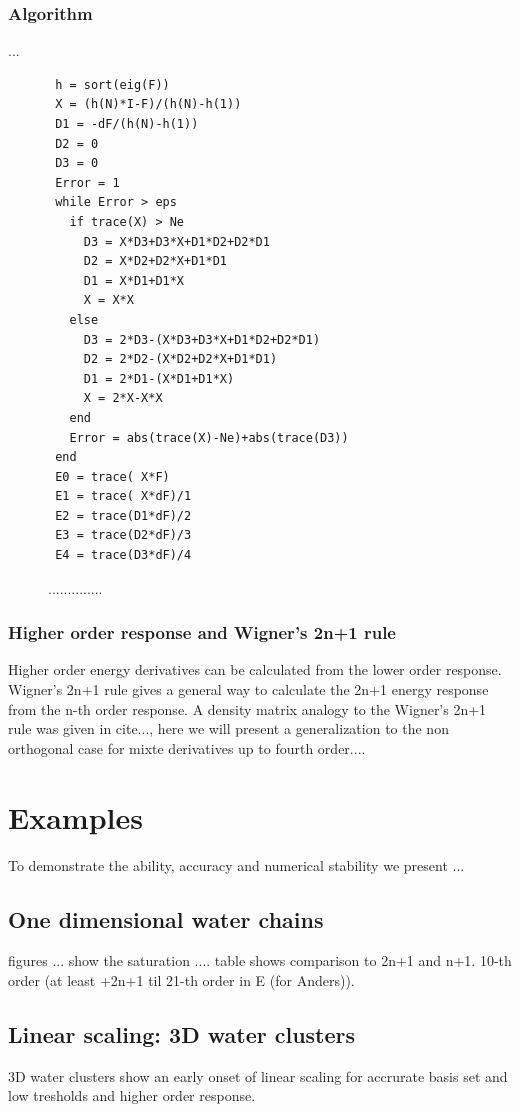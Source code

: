 \documentclass[twocolumn,showpacs,preprintnumbers,amsmath,amssymb]{revtex4}
\begin{document}
\subsubsection{Algorithm}
...\\
\begin{figure}[htbp]
  \centering
  \caption{\protect
    ..............
  }\label{fig:algo}
\begin{verbatim}
 h = sort(eig(F))
 X = (h(N)*I-F)/(h(N)-h(1))
 D1 = -dF/(h(N)-h(1))
 D2 = 0
 D3 = 0
 Error = 1
 while Error > eps
   if trace(X) > Ne
     D3 = X*D3+D3*X+D1*D2+D2*D1
     D2 = X*D2+D2*X+D1*D1
     D1 = X*D1+D1*X
     X = X*X
   else
     D3 = 2*D3-(X*D3+D3*X+D1*D2+D2*D1)
     D2 = 2*D2-(X*D2+D2*X+D1*D1)
     D1 = 2*D1-(X*D1+D1*X)
     X = 2*X-X*X
   end
   Error = abs(trace(X)-Ne)+abs(trace(D3))
 end
 E0 = trace( X*F)
 E1 = trace( X*dF)/1
 E2 = trace(D1*dF)/2
 E3 = trace(D2*dF)/3
 E4 = trace(D3*dF)/4
\end{verbatim}
\end{figure}


\subsubsection{Higher order response and Wigner's 2n+1 rule }
Higher order energy derivatives can be calculated from the lower
order response. Wigner's 2n+1 rule gives a general way to calculate the 2n+1
energy response from the n-th order response. A density matrix analogy to
the Wigner's 2n+1 rule was given in cite{...}, here we will present
a generalization to the non orthogonal case for mixte derivatives 
up to fourth order....
\section{Examples}
To demonstrate the ability, accuracy and numerical stability we present
...
\subsection{One dimensional water chains}
figures ... show the saturation ....
table shows comparison to 2n+1 and n+1.
10-th order (at least +2n+1 til 21-th order in E (for Anders)).
\subsection{Linear scaling: 3D water clusters}
3D water clusters show an early onset of linear scaling for accrurate
basis set and low tresholds and higher order response.
\end{document}
